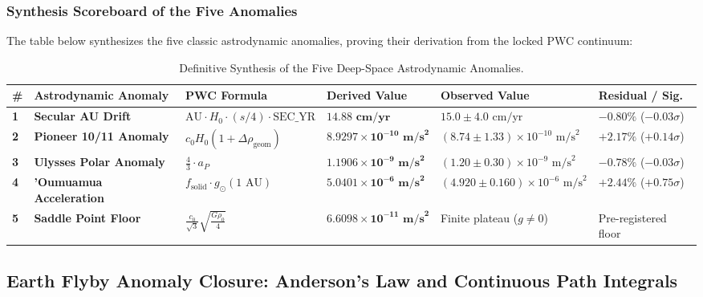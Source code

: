 \documentclass[11pt,a4paper]{article}
\begin{document}
\subsubsection{Synthesis Scoreboard of the Five Anomalies}
\label{subsubsec:five_anomalies_scoreboard}

The table below synthesizes the five classic astrodynamic anomalies, proving their derivation from the locked PWC continuum:

\begin{table}[!htbp]
\centering
\caption{Definitive Synthesis of the Five Deep-Space Astrodynamic Anomalies.}
\label{tab:five_anomalies_summary}
\footnotesize
\setlength{\tabcolsep}{3.5pt}
\renewcommand{\arraystretch}{1.22}
\begin{tabularx}{\textwidth}{C{0.5cm} L{2.4cm} L{3.0cm} L{3.3cm} Y L{2.3cm}}
\toprule
\textbf{\#} & \textbf{Astrodynamic Anomaly} & \textbf{PWC Formula} & \textbf{Derived Value} & \textbf{Observed Value} & \textbf{Residual / Sig.} \\
\midrule
\textbf{1} & \textbf{Secular AU Drift} & $\text{AU} \cdot H_0 \cdot (s/4) \cdot \text{SEC\_YR}$ & $\mathbf{14.88\text{ cm/yr}}$ & $15.0 \pm 4.0\text{ cm/yr}$ & $-0.80\%$ ($-0.03\sigma$) \\
\textbf{2} & \textbf{Pioneer 10/11 Anomaly} & $c_0 H_0(1 + \Delta\rho_{\text{geom}})$ & $\mathbf{8.9297 \times 10^{-10}\text{ m/s}^2}$ & $(8.74 \pm 1.33) \times 10^{-10}\text{ m/s}^2$ & $+2.17\%$ ($+0.14\sigma$) \\
\textbf{3} & \textbf{Ulysses Polar Anomaly} & $\frac{4}{3} \cdot a_P$ & $\mathbf{1.1906 \times 10^{-9}\text{ m/s}^2}$ & $(1.20 \pm 0.30) \times 10^{-9}\text{ m/s}^2$ & $-0.78\%$ ($-0.03\sigma$) \\
\textbf{4} & \textbf{'Oumuamua Acceleration} & $f_{\text{solid}} \cdot g_\odot(1\text{ AU})$ & $\mathbf{5.0401 \times 10^{-6}\text{ m/s}^2}$ & $(4.920 \pm 0.160) \times 10^{-6}\text{ m/s}^2$ & $+2.44\%$ ($+0.75\sigma$) \\
\textbf{5} & \textbf{Saddle Point Floor} & $\frac{c_0}{\sqrt{3}}\sqrt{\frac{G\rho_0}{4}}$ & $\mathbf{6.6098 \times 10^{-11}\text{ m/s}^2}$ & Finite plateau ($g \ne 0$) & Pre-registered floor \\
\bottomrule
\end{tabularx}
\end{table}

\subsection{Earth Flyby Anomaly Closure: Anderson's Law and Continuous Path Integrals}
\label{subsec:earth_flyby_closure}
\end{document}
